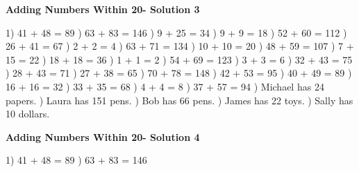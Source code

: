 \documentclass{article}%
\begin{document}
\large%
\begin{center}%
\textbf{Adding Numbers Within 20- Solution 3}%
\newline%
\end{center} \normalsize%
1) 41 + 48 = 89%
) 63 + 83 = 146%
) 9 + 25 = 34%
) 9 + 9 = 18%
) 52 + 60 = 112%
) 26 + 41 = 67%
) 2 + 2 = 4%
) 63 + 71 = 134%
) 10 + 10 = 20%
) 48 + 59 = 107%
) 7 + 15 = 22%
) 18 + 18 = 36%
) 1 + 1 = 2%
) 54 + 69 = 123%
) 3 + 3 = 6%
) 32 + 43 = 75%
) 28 + 43 = 71%
) 27 + 38 = 65%
) 70 + 78 = 148%
) 42 + 53 = 95%
) 40 + 49 = 89%
) 16 + 16 = 32%
) 33 + 35 = 68%
) 4 + 4 = 8%
) 37 + 57 = 94%
) Michael has 24 papers.%
) Laura has 151 pens.%
) Bob has 66 pens.%
) James has 22 toys.%
) Sally has 10 dollars.%
\newline%
\newpage%
\large%
\begin{center}%
\textbf{Adding Numbers Within 20- Solution 4}%
\newline%
\end{center} \normalsize%
1) 41 + 48 = 89%
) 63 + 83 = 146%
\end{document}
